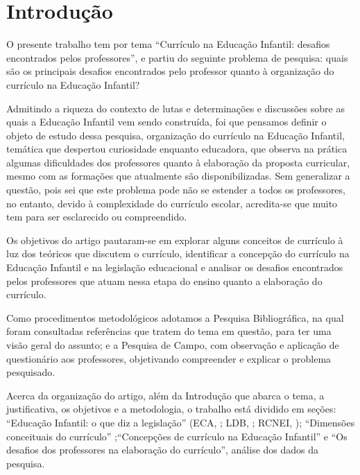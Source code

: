 \begin{refsection}
\begin{otherlanguage}{english}
    \end{otherlanguage}

    \section{Introdução}

    O presente trabalho tem por tema “Currículo na Educação Infantil: desafios encontrados pelos professores”, e partiu do seguinte problema de pesquisa: quais são os principais desafios encontrados pelo professor quanto à organização do currículo na Educação Infantil?  

    Admitindo a riqueza do contexto de lutas e determinações e discussões sobre as quais a Educação Infantil vem sendo construída, foi que pensamos definir o objeto de estudo dessa pesquisa, organização do currículo na Educação Infantil, temática que despertou curiosidade enquanto educadora, que observa na prática algumas dificuldades dos professores quanto à elaboração da proposta curricular, mesmo com as formações que atualmente são disponibilizadas. Sem generalizar a questão, pois sei que este problema pode não se estender a todos os professores, no entanto, devido à complexidade do currículo escolar, acredita-se que muito tem para ser esclarecido ou compreendido. 

    Os objetivos do artigo pautaram-se em explorar alguns conceitos de currículo à luz dos teóricos que discutem o currículo, identificar a concepção do currículo na Educação Infantil e na legislação educacional e analisar os desafios encontrados pelos professores que atuam nessa etapa do ensino quanto a elaboração do currículo. 

    Como procedimentos metodológicos adotamos a Pesquisa Bibliográfica, na qual foram consultadas referências que tratem do tema em questão, para ter uma visão geral do assunto; e a Pesquisa de Campo, com observação e aplicação de questionário aos professores, objetivando compreender e explicar o problema pesquisado. 

    Acerca da organização do artigo, além da Introdução que abarca o tema, a justificativa, os objetivos e a metodologia, o trabalho está dividido em seções: “Educação Infantil: o que diz a legislação” (ECA, ; LDB, ; RCNEI, ); “Dimensões conceituais do currículo” \cite{MoreiraAndSilva2005Currículo,CAVALCANTI2011Currículo,SACRISTÁN1999Poderes};“Concepções de currículo na Educação Infantil” \cite{OLIVEIRA2013Novas,BARBOSA2009Práticas,KRAMER2003Formação} e “Os desafios dos professores na elaboração do currículo”, análise dos dados da pesquisa. 


\end{refsection}
